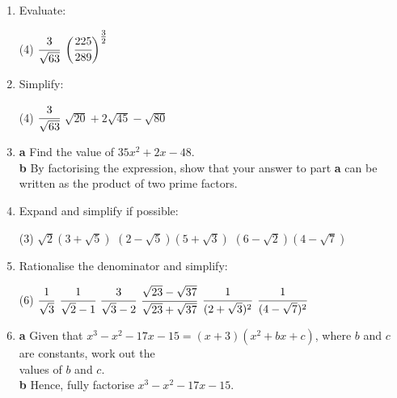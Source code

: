 \documentclass[fleqn]{article}
\begin{document}
\begin{enumerate}
	\item Evaluate: \vspace{-2mm}
		\begin{tasks}(4) %
			\task $\cfrac{3}{\sqrt{63}}$
			\task $\bigg(\cfrac{225}{289}\bigg)^{\textstyle\frac{3}{2}}$
		\end{tasks}
	\item Simplify: \vspace{-2mm} %
		\begin{tasks}(4)
			\task $\cfrac{3}{\sqrt{63}}$				%
			\task $\sqrt{20}+2\sqrt{45}-\sqrt{80}$	%
		\end{tasks}
	\item \hspace*{2mm}\textbf{a}\hspace*{5mm} Find the value of $35x^2+2x-48$.\vspace{1mm}\\
		  \hspace*{2mm}\textbf{b}\hspace*{5mm} By factorising the expression, show that your answer to part \textbf{a} can be written as the product of two \linebreak\hspace*{10.5mm}prime factors.
	\item Expand and simplify if possible:
		\begin{tasks}(3) %
			\task $\sqrt{2}(3+\sqrt{5})$
			\task $(2-\sqrt{5})(5+\sqrt{3})$
			\task $(6-\sqrt{2})(4-\sqrt{7})$
		\end{tasks}
	\item Rationalise the denominator and simplify: \vspace{-2mm}
	\begin{tasks}(6) %
			\task $\cfrac{1}{\sqrt{3}}$
			\task $\cfrac{1}{\sqrt{2}-1}$
			\task $\cfrac{3}{\sqrt{3}-2}$
			\task $\cfrac{\sqrt{23}-\sqrt{37}}{\sqrt{23}+\sqrt{37}}$
			\task $\cfrac{1}{(2+\sqrt{3})^2}$
			\task $\cfrac{1}{(4-\sqrt{7})^2}$
		\end{tasks}
	\item \hspace*{2mm}\textbf{a}\hspace*{5mm} Given that $x^3-x^2-17x-15=(x+3)(x^2+bx+c)$, where $b$ and $c$ are constants, work out the \\\hspace*{9mm} values of $b$ and $c$.\vspace{1mm}\\
		  \hspace*{2mm}\textbf{b}\hspace*{5mm} Hence, fully factorise $x^3-x^2-17x-15$.
	\newpage
		  

\end{enumerate}
\end{document}
